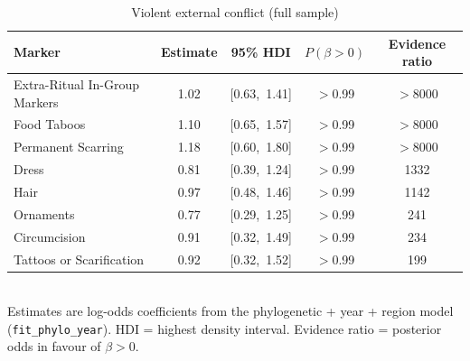 \begin{table}[ht]
\centering
\caption{Violent external conflict (full sample)}
\begin{tabular}{lcccc}
\toprule
Marker & Estimate & 95\% HDI & $P(\beta > 0)$ & Evidence ratio \\
\midrule
Extra-Ritual In-Group Markers & 1.02 & [0.63,\ 1.41] & $>$0.99 & $>$8000 \\
Food Taboos & 1.10 & [0.65,\ 1.57] & $>$0.99 & $>$8000 \\
Permanent Scarring & 1.18 & [0.60,\ 1.80] & $>$0.99 & $>$8000 \\
Dress & 0.81 & [0.39,\ 1.24] & $>$0.99 & 1332 \\
Hair & 0.97 & [0.48,\ 1.46] & $>$0.99 & 1142 \\
Ornaments & 0.77 & [0.29,\ 1.25] & $>$0.99 & 241 \\
Circumcision & 0.91 & [0.32,\ 1.49] & $>$0.99 & 234 \\
Tattoos or Scarification & 0.92 & [0.32,\ 1.52] & $>$0.99 & 199 \\
\bottomrule
\end{tabular}
\\[4pt]\small Estimates are log-odds coefficients from the phylogenetic + year + region model (\texttt{fit\_phylo\_year}). HDI = highest density interval. Evidence ratio = posterior odds in favour of $\beta > 0$.
\end{table}